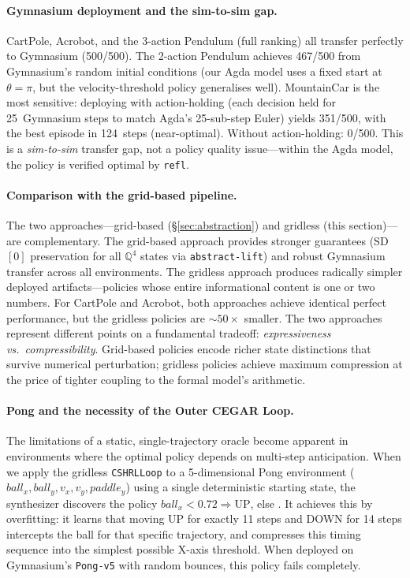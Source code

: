 \documentclass[9pt,a4paper]{article}
\theoremstyle{plain}
\theoremstyle{definition}
\theoremstyle{remark}
\begin{document}
\paragraph{Gymnasium deployment and the sim-to-sim gap.}
CartPole, Acrobot, and the 3-action Pendulum (full ranking) all transfer perfectly to Gymnasium (500/500).  The 2-action Pendulum achieves 467/500 from Gymnasium's random initial conditions (our Agda model uses a fixed start at $\theta = \pi$, but the velocity-threshold policy generalises well).  MountainCar is the most sensitive: deploying with action-holding (each decision held for 25~Gymnasium steps to match Agda's 25-sub-step Euler) yields 351/500, with the best episode in 124~steps (near-optimal).  Without action-holding: 0/500.  This is a \emph{sim-to-sim} transfer gap, not a policy quality issue---within the Agda model, the policy is verified optimal by \texttt{refl}.

\paragraph{Comparison with the grid-based pipeline.}
The two approaches---grid-based (\S\ref{sec:abstraction}) and gridless (this section)---are complementary.  The grid-based approach provides stronger guarantees (SD$[0]$ preservation for all $\mathbb{Q}^4$ states via \texttt{abstract-lift}) and robust Gymnasium transfer across all environments.  The gridless approach produces radically simpler deployed artifacts---policies whose entire informational content is one or two numbers.  For CartPole and Acrobot, both approaches achieve identical perfect performance, but the gridless policies are ${\sim}50\times$ smaller.  The two approaches represent different points on a fundamental tradeoff: \emph{expressiveness vs.\ compressibility}.  Grid-based policies encode richer state distinctions that survive numerical perturbation; gridless policies achieve maximum compression at the price of tighter coupling to the formal model's arithmetic.


\paragraph{Pong and the necessity of the Outer CEGAR Loop.}
The limitations of a static, single-trajectory oracle become apparent in environments where the optimal policy depends on multi-step anticipation. When we apply the gridless \texttt{CSHRLLoop} to a 5-dimensional Pong environment ($ball_x, ball_y, v_x, v_y, paddle_y$) using a single deterministic starting state, the synthesizer discovers the policy $ball_x < 0.72 \Rightarrow \text{UP}$, else . It achieves this by overfitting: it learns that moving UP for exactly 11 steps and DOWN for 14 steps intercepts the ball for that specific trajectory, and compresses this timing sequence into the simplest possible X-axis threshold. When deployed on Gymnasium's \texttt{Pong-v5} with random bounces, this policy fails completely.
\end{document}
